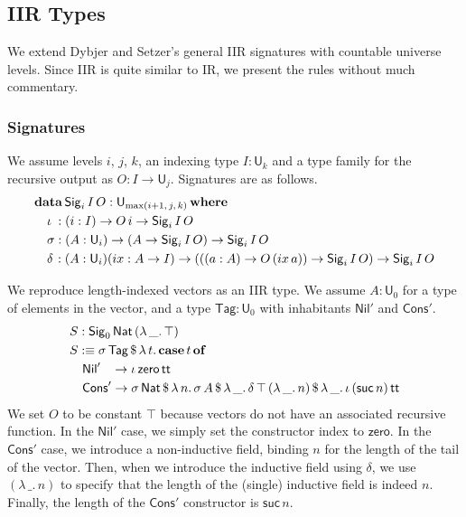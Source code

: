 \documentclass[acmsmall,screen,review,anonymous]{acmart}
\newcommand{\msf}[1]{{\mathsf{#1}}}
\newcommand{\mbf}[1]{{\mathbf{#1}}}
\newcommand{\data}{\mbf{data}}
\newcommand{\U}{\msf{U}}
\newcommand{\where}{\mbf{where}}
\newcommand{\Nat}{\msf{Nat}}
\newcommand{\zero}{\msf{zero}}
\newcommand{\suc}{\msf{suc}}
\newcommand{\Nil}{\msf{Nil}}
\newcommand{\Cons}{\msf{Cons}}
\newcommand{\Sig}{\msf{Sig}}
\newcommand{\Tag}{\msf{Tag}}
\newcommand{\case}{\mbf{case}}
\newcommand{\of}{\mbf{of}}
\newcommand{\ttt}{\msf{tt}}
\newcommand{\ix}{{ix}}
\begin{document}
\subsection{IIR Types}\label{sec:iir}

We extend Dybjer and Setzer's general IIR signatures \cite{TODO} with countable universe levels. Since
IIR is quite similar to IR, we present the rules without much commentary.

\subsubsection{Signatures}\label{sec:iir-signatures} We assume levels $i$, $j$, $k$, an indexing type $I : \U_k$ and a type family
for the recursive output as $O : I \to \U_j$. Signatures are as follows.
\begin{alignat*}{4}
  &\data\, \Sig_i\,I\,O : \U_{\max(i+1,\,j,\,k)}\,\where\\
  &\quad \iota\hspace{0.25em}  : (i : I) \to O\,i \to \Sig_i\,I\,O \\
  &\quad \sigma                : (A : \U_i) \to (A \to \Sig_i\,I\,O) \to \Sig_i\,I\,O \\
  &\quad \delta\hspace{0.1em}  : (A : \U_i)(\ix : A \to I) \to (((a : A) \to O\,(\ix\,a)) \to \Sig_i\,I\,O) \to \Sig_i\,I\,O
\end{alignat*}

\begin{example} We reproduce length-indexed vectors as an IIR type. We assume $A : \U_0$ for a type of elements in the vector,
and a type $\Tag : \U_0$ with inhabitants $\Nil'$ and $\Cons'$.
\begin{alignat*}{4}
  & S : \Sig_0\,\Nat\,(\lambda\,\_.\,\top)\\
  & S :\equiv \sigma\,\Tag\,\$\,\lambda\,t.\,\case\,t\,\of \\
  & \quad \Nil'\hspace{0.85em} \to \iota\,\zero\,\ttt \\
  & \quad \Cons'\to \sigma\,\Nat\,\$\,\lambda\,n.\,\sigma\,A\,\$\,\lambda\,\_.\,\delta\,\top\,(\lambda\,\_.\,n)\,\$\,\lambda\,\_.\,\iota\,(\suc\,n)\,\ttt
\end{alignat*}
We set $O$ to be constant $\top$ because vectors do not have an associated recursive function. In
the $\Nil'$ case, we simply set the constructor index to $\zero$. In the $\Cons'$ case, we introduce
a non-inductive field, binding $n$ for the length of the tail of the vector. Then, when we introduce
the inductive field using $\delta$, we use $(\lambda\,\_.\,n)$ to specify that the length of the
(single) inductive field is indeed $n$. Finally, the length of the $\Cons'$ constructor is $\suc\,n$.
\end{example}
\end{document}
